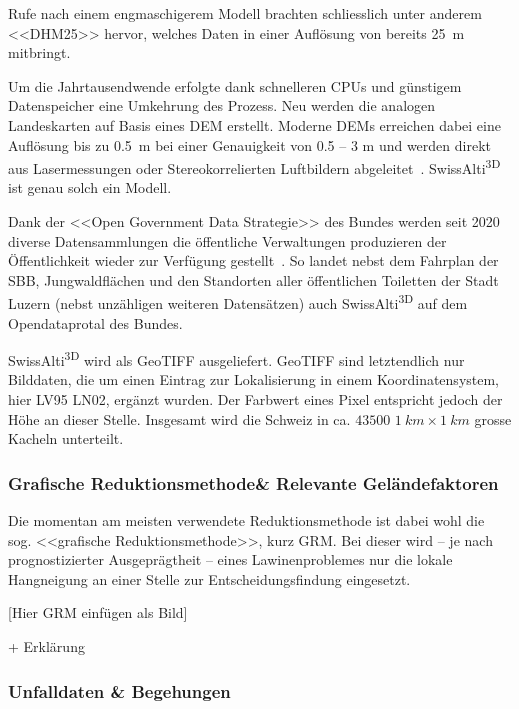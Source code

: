 Rufe nach einem engmaschigerem Modell brachten schliesslich unter anderem <<DHM25>> hervor, welches Daten in einer Auflösung von bereits \qty{25}{m} mitbringt.~\cite{swisstopohistdem}

Um die Jahrtausendwende erfolgte dank schnelleren CPUs und günstigem Datenspeicher eine Umkehrung des Prozess. Neu werden die analogen Landeskarten auf Basis eines DEM erstellt. Moderne DEMs erreichen dabei eine Auflösung bis zu \qty{0.5}{m} bei einer Genauigkeit von 0.5 -- 3 \unit{m} und werden direkt aus Lasermessungen oder Stereokorrelierten Luftbildern abgeleitet~\cite{alti3dprod}. SwissAlti\textsuperscript{3D} ist genau solch ein Modell.

Dank der <<Open Government Data Strategie>> des Bundes werden seit 2020 diverse Datensammlungen die öffentliche Verwaltungen produzieren der Öffentlichkeit wieder zur Verfügung gestellt~\cite{opendataswiss}.
So landet nebst dem Fahrplan der SBB, Jungwaldflächen und den Standorten aller öffentlichen Toiletten der Stadt Luzern (nebst unzähligen weiteren Datensätzen) auch  SwissAlti\textsuperscript{3D} auf dem Opendataprotal des Bundes.

SwissAlti\textsuperscript{3D} wird als GeoTIFF ausgeliefert. GeoTIFF sind letztendlich nur Bilddaten, die um einen Eintrag zur Lokalisierung in einem Koordinatensystem, hier LV95 LN02, ergänzt wurden. Der Farbwert eines Pixel entspricht jedoch der Höhe an dieser Stelle. Insgesamt wird die Schweiz in ca. $43500$ $\qty{1}{km} \times \qty{1}{km}$ grosse Kacheln unterteilt.~\cite{alti3dprod}

\subsubsection{Grafische Reduktionsmethode\& Relevante Geländefaktoren}

Die momentan am meisten verwendete Reduktionsmethode ist dabei wohl die sog. <<grafische Reduktionsmethode>>, kurz GRM. Bei dieser wird -- je nach prognostizierter Ausgeprägtheit -- eines Lawinenproblemes nur die lokale Hangneigung an einer Stelle zur Entscheidungsfindung eingesetzt.~\cite{sacbergspwinter}

[Hier GRM einfügen als Bild]

+ Erklärung

\subsubsection{Unfalldaten \& Begehungen}

